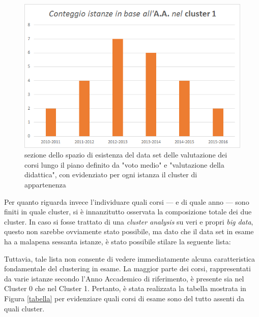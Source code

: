         \begin{figure}
            \centering
            \caption{sezione dello spazio di esistenza del data set delle valutazione dei corsi lungo il piano definito da "voto medio" e "valutazione della didattica", con evidenziato per ogni istanza il cluster di appartenenza}
            \label{AA2}
            \includegraphics[scale=0.5]{../cluster/min_kmeans_2cl_AA_cl1.png}
        \end{figure}

        Per quanto riguarda invece l'individuare quali corsi --- e di quale anno --- sono finiti in quale cluster, si è innanzitutto osservata la composizione totale dei due cluster. In caso si fosse trattato di una \textit{cluster analysis} su veri e propri \textit{big data}, questo non sarebbe ovviamente stato possibile, ma dato che il data set in esame ha a malapena sessanta istanze, è stato possibile stilare la seguente lista:

        

        Tuttavia, tale lista non consente di vedere immediatamente alcuna caratteristica fondamentale del clustering in esame. La maggior parte dei corsi, rappresentati da varie istanze secondo l'Anno Accademico di riferimento, è presente sia nel Cluster 0 che nel Cluster 1. Pertanto, è stata realizzata la tabella mostrata in Figura \ref{tabella} per evidenziare quali corsi di esame sono del tutto assenti da quali cluster.

